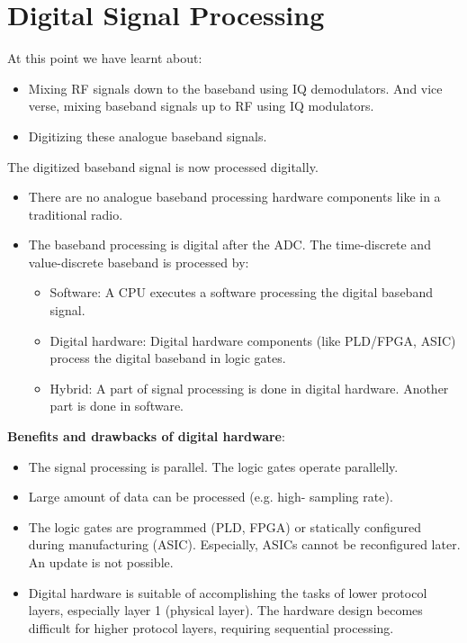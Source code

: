 %
%
%

\chapter{Digital Signal Processing}

\begin{refsection}
	
At this point we have learnt about:
\begin{itemize}
	\item Mixing \ac{RF} signals down to the baseband using IQ demodulators. And vice verse, mixing baseband signals up to \ac{RF} using IQ modulators.
	\item Digitizing these analogue baseband signals.
\end{itemize}

The digitized baseband signal is now processed digitally.
\begin{itemize}
	\item There are no analogue baseband processing hardware components like in a traditional radio.
	\item The baseband processing is digital after the \ac{ADC}. The time-discrete and value-discrete baseband is processed by:
	\begin{itemize}
		\item Software: A \ac{CPU} executes a software processing the digital baseband signal.
		\item Digital hardware: Digital hardware components (like \ac{PLD}/\ac{FPGA}, \ac{ASIC}) process the digital baseband in logic gates.
		\item Hybrid: A part of signal processing is done in digital hardware. Another part is done in software.
	\end{itemize}
\end{itemize}

\textbf{Benefits and drawbacks of digital hardware}:
\begin{itemize}
	\item The signal processing is parallel. The logic gates operate parallelly.
	\item Large amount of data can be processed (e.g. high- sampling rate).
	\item The logic gates are programmed (\ac{PLD}, \ac{FPGA}) or statically configured during manufacturing (\ac{ASIC}). Especially, \acp{ASIC} cannot be reconfigured later. An update is not possible.
	\item Digital hardware is suitable of accomplishing the tasks of lower protocol layers, especially layer 1 (physical layer). The hardware design becomes difficult for higher protocol layers, requiring sequential processing.
\end{itemize}


\end{refsection}
